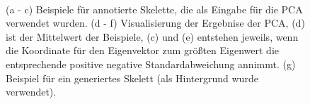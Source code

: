 \begin{figure}
  \\
  
  \caption{(a - c) Beispiele für annotierte Skelette, die als Eingabe für die PCA verwendet wurden. (d - f) Visualisierung der Ergebnise der PCA, (d) ist der Mittelwert der Beispiele, (c) und (e) entstehen jeweils, wenn die Koordinate für den Eigenvektor zum größten Eigenwert die entsprechende positive \bzw negative Standardabweichung annimmt. (g) Beispiel für ein generiertes Skelett (als Hintergrund wurde \cite{background} verwendet).}
  \label{intro_pic}
 \end{figure}
